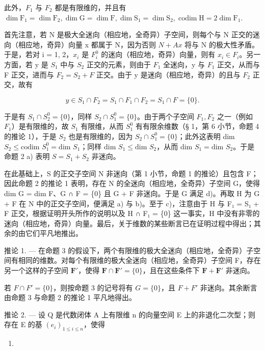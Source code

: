 此外，\(F_{1}\) 与 \(F_{2}\) 都是有限维的，并且有 \(\dim \mathrm{F}_1 = \dim \mathrm{F}_2, \dim \mathrm{G} = \dim \mathrm{F}, \dim \mathrm{S}_1 = \dim \mathrm{S}_2, \operatorname{codim} \mathrm{H} = 2 \dim \mathrm{F}_1.\)

首先注意，若 N 是极大全迷向（相应地，全奇异）子空间，则每个与 N 正交的迷向（相应地，奇异）向量 x 都属于 N，因为否则 \(N + Ax\) 将与 N 的极大性矛盾。于是，若对 i = 1, 2，\(x_{i}\) 是 \(F_{i}^{0}\) 的迷向（相应地，奇异）向量，则有 \(x_{i} \in F_{i}\)。另一方面，若 y 是 \(S_{1}\) 中与 \(S_{2}\) 正交的元素，则由于 \(F_{1}\) 全迷向，y 与 \(F_{1}\) 正交，从而与 F 正交，进而与 \(F_{2} = S_{2} + F\) 正交。由于 y 是迷向（相应地，奇异）的且与 \(F_{2}\) 正交，故有

\[
y \in S _ {1} \cap F _ {2} = S _ {1} \cap F _ {1} \cap F _ {2} = S _ {1} \cap F = \{0 \}.
\]

于是有 \(S_1 \cap S_2^0 = \{0\}\)，同样 \(S_2 \cap S_1^0 = \{0\}\)。由于两个子空间 \(F_1, F_2\) 之一（例如 \(F_1\)）是有限维的，故 \(S_1\) 有限维，从而 \(S_1^0\) 有有限余维数（§ 1，第 6 小节，命题 4 的推论 1），于是 \(S_2\) 也是有限维的，因为 \(S_2 \cap S_1^0 = \{0\}\)；此外这表明 dim \(S_2 \leqslant \text{codim } S_1^0 = \text{dim } S_1\)；同样 dim \(S_1 \leqslant \text{dim } S_2\)，从而 dim \(S_1 = \text{dim } S_2\)。于是命题 2 a) 表明 \(S = S_1 + S_2\) 非迷向。

在此基础上，S 的正交子空间 N 非迷向（第 1 小节，命题 1 的推论）且包含 F；因此命题 2 的推论 1 表明，存在 N 的全迷向（相应地，全奇异）子空间 G，使得 dim G = dim F、G ∩ F = \{0\} 且 G + F 非迷向。于是 G 满足 d)。再取 H 为 G + F 在 N 中的正交子空间，便满足 a) 与 b)。至于 c)，注意由于 H 与 F₁ = S₁ + F 正交，根据证明开头所作的说明以及 H ∩ F₁ = \{0\} 这一事实，H 中没有非零的迷向（相应地，奇异）向量。最后，关于维数的某些断言已在证明过程中得出；其余的由它们平凡地推出。

推论 1. --- 在命题 3 的假设下，两个有限维的极大全迷向（相应地，全奇异）子空间有相同的维数。对每个有限维的极大全迷向（相应地，全奇异）子空间 F，存在另一个这样的子空间 \(\mathbf{F}'\)，使得 \(\mathbf{F} \cap \mathbf{F}' = \{0\}\)，且在这些条件下 \(\mathbf{F} + \mathbf{F}'\) 非迷向。

若 \(F \cap F' = \{0\}\)，则按命题 3 的记号将有 \(G = \{0\}\)，且 \(F + F'\) 非迷向。其余断言由命题 3 与命题 2 的推论 1 平凡地得出。

推论 2. --- 设 Q 是代数闭体 A 上有限维 n 的向量空间 E 上的非退化二次型；则存在 E 的基 \((e_i)_{1 \leqslant i \leqslant n}\)，使得

\begin{enumerate}
\def\labelenumi{(\arabic{enumi})}
\setcounter{enumi}{1}
\tightlist
\item
\end{enumerate}

